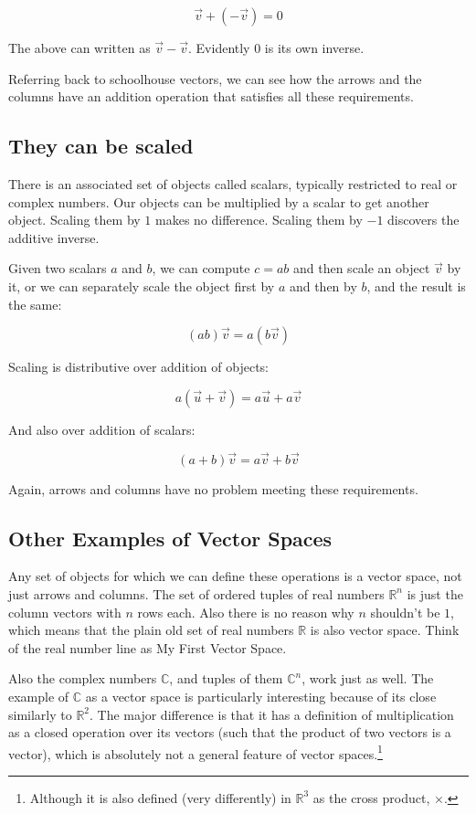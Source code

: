 $$\vec{v} + (-\vec{v}) = 0$$

The above can written as $\vec{v} - \vec{v}$. Evidently $0$ is its own inverse.

Referring back to schoolhouse vectors, we can see how the arrows and the columns have an addition operation that satisfies all these requirements.

\subsection{They can be scaled}

There is an associated set of objects called scalars, typically restricted to real or complex numbers. Our objects can be multiplied by a scalar to get another object. Scaling them by $1$ makes no difference. Scaling them by $-1$ discovers the additive inverse.

Given two scalars $a$ and $b$, we can compute $c = ab$ and then scale an object $\vec{v}$ by it, or we can separately scale the object first by $a$ and then by $b$, and the result is the same:

$$(ab)\vec{v} = a(b\vec{v})$$

Scaling is distributive over addition of objects:

$$a(\vec{u} + \vec{v}) = a\vec{u} + a\vec{v}$$

And also over addition of scalars:

$$(a + b)\vec{v} = a\vec{v} + b\vec{v}$$

Again, arrows and columns have no problem meeting these requirements.

\subsection{Other Examples of Vector Spaces}

Any set of objects for which we can define these operations is a vector space, not just arrows and columns. The set of ordered tuples of real numbers $\mathbb{R}^n$ is just the column vectors with $n$ rows each. Also there is no reason why $n$ shouldn't be $1$, which means that the plain old set of real numbers $\mathbb{R}$ is also vector space. Think of the real number line as My First Vector Space\texttrademark.

Also the complex numbers $\mathbb{C}$, and tuples of them $\mathbb{C}^n$, work just as well. The example of $\mathbb{C}$ as a vector space is particularly interesting because of its close similarly to $\mathbb{R}^2$. The major difference is that it has a definition of multiplication as a closed operation over its vectors (such that the product of two vectors is a vector), which is absolutely not a general feature of vector spaces.\footnote{Although it is also defined (very differently) in $\mathbb{R}^3$ as the cross product, $\times$.}

